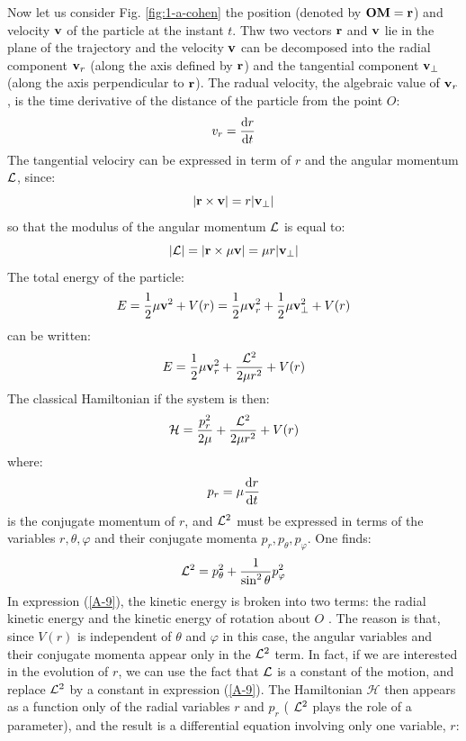 Now let us consider Fig. \ref{fig:1-a-cohen} the position (denoted by $\vb{OM}=\vb{r}$) and velocity $\vb{v}$ of the particle at the instant $t$. Thw two vectors $\vb{r}$ and $\vb{v}$ lie in the plane of the trajectory and the velocity $\vb{v}$ can be decomposed into the radial component $\vb{v}_r$ (along the axis defined by $\vb{r}$) and the tangential component $\vb{v}_\perp$ (along the axis perpendicular to $\vb{r}$). The radual velocity, the algebraic value of $\vb{v}_r$, is the time derivative of the distance of the particle from the point $O$:
\begin{equation}\label{A-4}
	v_r=\dv{r}{t}
\end{equation}
The tangential velociry can be expressed in term of $r$ and the angular momentum $\vb{\mathcal{L}}$, since:
\begin{equation}\label{A-5}
	|\vb{r}\times\vb{v}|=r|\vb{v}_\perp|
\end{equation}
so that the modulus of the angular momentum $\vb{\mathcal{L}}$ is equal to:
\begin{equation}\label{A-6}
	|\vb{\mathcal{L}}|=|\vb{r}\times\mu\vb{v}|=\mu r|\vb{v}_\perp|
\end{equation}
The total energy of the particle:
\begin{equation}\label{A-7}
	E=\frac{1}{2}\mu\vb{v}^2+V(r)=\frac{1}{2}\mu \vb{v}_r^2+\frac{1}{2}\mu \vb{v}_\perp^2+V(r)
\end{equation}
can be written:
\begin{equation}\label{A-8}
	E=\frac{1}{2}\mu\vb{v}_r^2+\frac{\vb{\mathcal{L}}^2}{2\mu r^2}+V(r)
\end{equation}
The classical Hamiltonian if the system is then:
\begin{equation}\label{A-9}
	\mathcal{H}=\frac{p_r^2}{2\mu}+\frac{\vb{\mathcal{L}}^2}{2\mu r^2} + V(r)
\end{equation}
where:
\begin{equation}\label{A-10}
	p_r=\mu\dv{r}{t}
\end{equation}
is the conjugate momentum of $r$,  and $\vb{\mathcal{L}}^2$ must be expressed in terms of the variables $r, \theta, \varphi$ and their conjugate momenta $p_r,p_\theta,p_\varphi$. One finds:
\begin{equation}\label{A-11}
	\vb{\mathcal{L}}^2=p_\theta ^2 +\frac{1}{\sin^2\theta}p_\varphi^2
\end{equation}
In expression (\ref{A-9}), the kinetic energy is broken into two terms: the radial kinetic energy and the kinetic energy of rotation about $O$ . The reason is that, since $V(r)$ is independent of $\theta$ and $\varphi$ in this case, the angular variables and their conjugate momenta appear only in the $\vb{\mathcal{L}}^2$ term. In fact, if we are interested in the evolution of $r$, we can use the fact that $\vb{\mathcal{L}}$ is a constant of the motion, and replace $\vb{\mathcal{L}}^2$ by a constant in expression (\ref{A-9}). The Hamiltonian $\mathcal{H}$  then appears as a function only of the radial variables $r$ and $p_r$ ( $\vb{\mathcal{L}}^2$ plays the role of a parameter), and the result is a differential equation involving only one variable, $r$:
